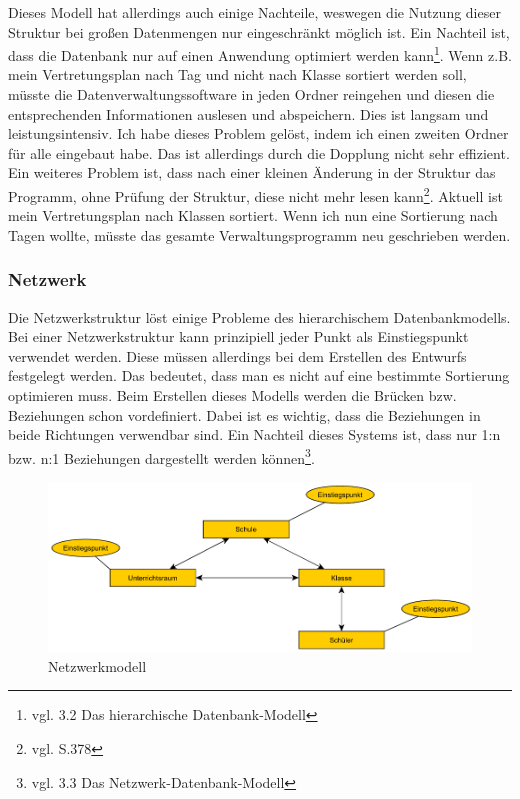 \documentclass[a4paper, 12pt]{article}
\theoremstyle{plain}
\theoremstyle{definition}
\begin{document}
Dieses Modell hat allerdings auch einige Nachteile, weswegen die Nutzung dieser Struktur bei großen Datenmengen nur eingeschränkt möglich ist. Ein Nachteil ist, dass die Datenbank nur auf einen Anwendung optimiert werden kann\footnote{vgl. \cite{Jarosch2010} 3.2 Das hierarchische Datenbank-Modell}. Wenn z.B. mein Vertretungsplan nach Tag und nicht nach Klasse sortiert werden soll, müsste die Datenverwaltungssoftware in jeden Ordner reingehen und diesen die entsprechenden Informationen auslesen und abspeichern. Dies ist langsam und leistungsintensiv. Ich habe dieses Problem gelöst, indem ich einen zweiten Ordner für alle eingebaut habe. Das ist allerdings durch die Dopplung nicht sehr effizient. \\
Ein weiteres Problem ist, dass nach einer kleinen Änderung in der Struktur das Programm, ohne Prüfung der Struktur, diese nicht mehr lesen kann\footnote{vgl. \cite{Codd1970} S.378}. Aktuell ist mein Vertretungsplan nach Klassen sortiert. Wenn ich nun eine Sortierung nach Tagen wollte, müsste das gesamte Verwaltungsprogramm neu geschrieben werden.
	
	\subsubsection{Netzwerk}
	\label{sec:netzdb}
	Die Netzwerkstruktur löst einige Probleme des hierarchischem Datenbankmodells. Bei einer Netzwerkstruktur kann prinzipiell jeder Punkt als Einstiegspunkt verwendet werden. Diese müssen allerdings bei dem Erstellen des Entwurfs festgelegt werden. Das bedeutet, dass man es nicht auf eine bestimmte Sortierung optimieren muss. Beim Erstellen dieses Modells werden die Brücken bzw. Beziehungen schon vordefiniert. Dabei ist es wichtig, dass die Beziehungen in beide Richtungen verwendbar sind. Ein Nachteil dieses Systems ist, dass nur 1:n bzw. n:1 Beziehungen dargestellt werden können\footnote{vgl. \cite{Jarosch2010} 3.3 Das Netzwerk-Datenbank-Modell}. 
	
\begin{figure}[h]
\includegraphics[scale=1]{netzwerkmodell.pdf}	
\caption{Netzwerkmodell}\label{fig:netzwerkModell}
\end{figure}
\end{document}
